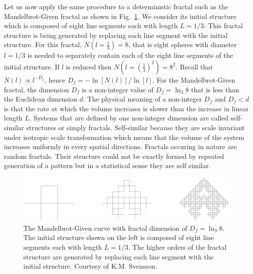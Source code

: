 Let us now apply the same procedure to a deterministic fractal such as the Mandelbrot-Given fractal as shown in Fig.~\ref{fig-mandelbrot}.  We consider its initial structure which is composed of eight line segments each with length $L=1/3$.  This fractal structure is being generated by replacing each line segment with the initial structure.  For this fractal, $N(l=\frac{1}{3})=8$, that is eight spheres with diameter $l=1/3$ is needed to separately contain each of the eight line segments of the initial structure.  If $l$ is reduced then $N(l=(\frac{1}{3})^2)=8^2$.  Recall that $N(l)\propto l^{-D_f}$, hence $D_f=-\mathrm{\ln}[N(l)]/\mathrm{\ln}[l]$.  For the Mandelbrot-Given fractal, the dimension $D_f$ is a non-integer value of $D_f=\mathrm{\ln}_3 8$ that is less than the Euclidean dimension $d$.  The physical meaning of a non-integer $D_f$ and $D_f<d$ is that the rate at which the volume increases is slower than the increase in linear length $L$.
%
Systems that are defined by one non-integer dimension are called self-similar structures or simply fractals.  Self-similar because they are scale invariant under isotropic scale transformation which means that the volume of the system increases uniformly in every spatial directions. 
Fractals occuring in nature are random fractals.  Their structure could not be exactly formed by repeated generation of a pattern but in a statistical sense they are self similar.
%
\begin{figure}
  \centering
  \includegraphics[width=6.0in]{Mandelbrot_Given}
   \caption[The Mandelbrot-Given curve with fractal dimension of $D_f=\ln_3 8$.]{The Mandelbrot-Given curve with fractal dimension of $D_f=\ln_3 8$.  The initial structure shown on the left is composed of eight line segments each with length $L=1/3$.  The higher orders of the fractal structure are generated by replacing each line segment with the initial structure.  Courtesy of K.M. Svensson.
}
\label{fig-mandelbrot}
\end{figure}
%


